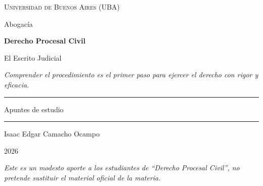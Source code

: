\documentclass[12pt,oneside]{book}
\newcommand{\universidad}{Universidad de Buenos Aires (UBA)}
\newcommand{\carrera}{Abogacía}
\newcommand{\materia}{Derecho Procesal Civil}
\newcommand{\titulo}{El Escrito Judicial}
\newcommand{\autor}{Isaac Edgar Camacho Ocampo}
\newcommand{\anio}{2026}
\begin{document}
\begin{titlepage}
\thispagestyle{empty}

\begin{center}

\vspace*{1cm}

{\large \textsc{\universidad}}

\vspace{0.4cm}

{\large \carrera}

\vspace{3cm}

{\Huge \textbf{\materia}}

\vspace{1cm}

{\LARGE \titulo}

\vspace{0.8cm}

\textit{Comprender el procedimiento es el primer paso para ejercer el derecho con rigor y eficacia.}

\vspace{1.2cm}

\rule{0.70\textwidth}{0.5pt}

\vspace{0.5cm}

{\large Apuntes de estudio}

\vspace{0.5cm}

\rule{0.70\textwidth}{0.5pt}

\vfill

{\large \autor}

\vspace{0.3cm}

{\large \anio}

\end{center}

\vfill

\begin{flushleft}
\textit{Este es un modesto aporte a los estudiantes de ``Derecho Procesal Civil'', no pretende sustituir el material oficial de la materia.}
\end{flushleft}

\end{titlepage}

\tableofcontents
\clearpage
\end{document}
